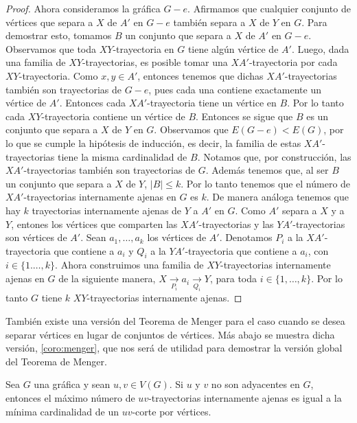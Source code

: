 \begin{proof}
    Ahora consideramos la gr\'afica $G-e$. Afirmamos que cualquier conjunto de
    v\'ertices que separa a $X$ de $A'$ en $G-e$ tambi\'en separa a $X$ de $Y$
    en $G$. Para demostrar esto, tomamos $B$ un conjunto que separa a $X$ de
    $A'$ en $G-e$. Observamos que toda $XY$-trayectoria en $G$ tiene alg\'un
    v\'ertice de $A'$. Luego, dada una familia de $XY$-trayectorias, es posible
    tomar una $XA'$-trayectoria por cada $XY$-trayectoria. Como $x,y \in A'$,
    entonces tenemos que dichas $XA'$-trayectorias tambi\'en son trayectorias de
    $G-e$, pues cada una contiene exactamente un v\'ertice de $A'$. Entonces
    cada $XA'$-trayectoria tiene un v\'ertice en $B$. Por lo tanto cada
    $XY$-trayectoria contiene un v\'ertice de $B$. Entonces se sigue que $B$ es
    un conjunto que separa a $X$ de $Y$ en $G$. Observamos que $E(G-e)<E(G)$,
    por lo que se cumple la hip\'otesis de inducci\'on, es decir, la familia de
    estas $XA'$-trayectorias tiene la misma cardinalidad de $B$. Notamos que,
    por construcci\'on, las $XA'$-trayectorias tambi\'en son trayectorias de
    $G$. Adem\'as tenemos que, al ser $B$ un conjunto que separa a $X$ de $Y$,
    $|B| \leq k$. Por lo tanto tenemos que el n\'umero de $XA'$-trayectorias
    internamente ajenas en $G$ es $k$. De manera an\'aloga tenemos que hay $k$
    trayectorias internamente ajenas de $Y$ a $A'$ en $G$. Como $A'$ separa a
    $X$ y a $Y$, entones los v\'ertices que comparten las $XA'$-trayectorias y
    las $YA'$-trayectorias son v\'ertices de $A'$. Sean $a_1, \dots, a_k$ los
    v\'ertices de $A'$. Denotamos $P_i$ a la $XA'$-trayectoria que contiene a
    $a_i$ y $Q_i$ a la $YA'$-trayectoria que contiene a $a_i$, con $i \in \{1.
    \dots, k\}$. Ahora construimos una familia de $XY$-trayectorias internamente
    ajenas en $G$ de la siguiente manera, $X \xrightarrow[P_i]{} a_i
    \xrightarrow[Q_i]{} Y$, para toda $i \in \{1, \dots, k\}$. Por lo tanto $G$
    tiene $k$ $XY$-trayectorias internamente ajenas. 
\end{proof}

 Tambi\'en existe una versi\'on del Teorema de Menger para el caso cuando se
 desea separar v\'ertices en lugar de conjuntos de v\'ertices. M\'as abajo se
 muestra dicha versi\'on, \cref{coro:menger}, que nos ser\'a de utilidad para
 demostrar la versi\'on global del Teorema de Menger.

 \begin{corolario}
    \label{coro:menger}
    Sea $G$ una gr\'afica y sean $u, v \in V(G)$. Si $u$ y $v$ no son adyacentes
    en $G$, entonces el m\'aximo n\'umero de $uv$-trayectorias internamente
    ajenas es igual a la m\'inima cardinalidad de un $uv$-corte por v\'ertices.
\end{corolario}

